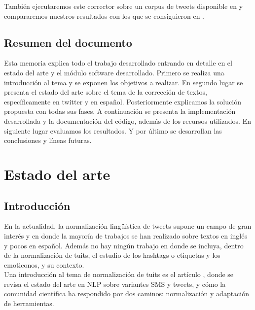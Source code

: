 \documentclass[spanish,12pt, a4paper,twoside]{paper}
\let\oldsection\section
\def\section{\cleardoublepage\oldsection}
\begin{document}
También ejecutaremos este corrector sobre un corpus de tweets disponible en \cite{tweetnorm} y compararemos nuestros resultados con los que se consiguieron en \cite{alegria:2013}.

\subsection{Resumen del documento}\label{sec:resumen}
Esta memoria explica todo el trabajo desarrollado entrando en detalle en el estado del arte y el  módulo software desarrollado. Primero se realiza una introducción al tema y se exponen los objetivos a realizar. En segundo lugar se presenta el estado del arte sobre el tema de la corrección de textos, específicamente en twitter y en español. Posteriormente explicamos la solución propuesta con todas sus fases. A continuación se presenta la implementación desarrollada y la documentación del código, además de los recursos utilizados. En siguiente lugar evaluamos los resultados. Y por último se desarrollan las conclusiones y líneas futuras.
\section{Estado del arte}\label{sec:estadodelarte}
\subsection{Introducción}\label{sec:introduccion}
En la actualidad, la normalización lingüística de tweets \cite{baldwin:2011} supone un campo de gran interés y en donde la mayoría de trabajos se han realizado sobre textos en inglés y pocos en español. Además no hay ningún trabajo en donde se incluya, dentro de la normalización de tuits, el estudio de los hashtags o etiquetas y los emoticonos, y su contexto. \\
Una introducción al tema de normalización de tuits es el artículo \cite{eisenstein:2013}, donde se revisa el estado del arte en NLP sobre variantes SMS y tweets, y cómo la comunidad científica ha respondido por dos caminos: normalización y adaptación de herramientas.
\end{document}
